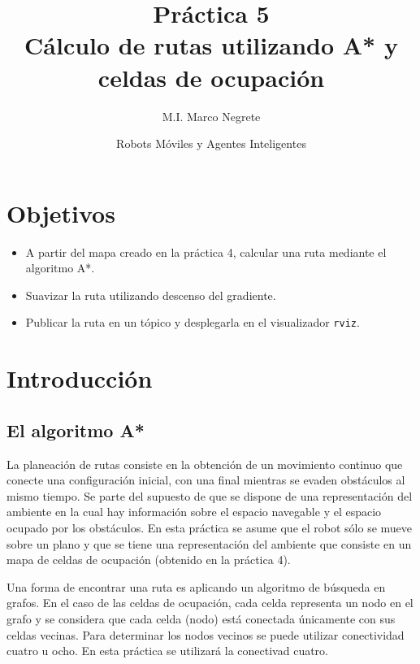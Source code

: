 \documentclass[letterpaper,12pt]{article}
\title{Práctica 5  \\ Cálculo de rutas utilizando A* y celdas de ocupación}
\author{M.I. Marco Negrete}
\date{Robots Móviles y Agentes Inteligentes}
\begin{document}
\renewcommand{\tablename}{Tabla}
\maketitle
\section*{Objetivos}
\begin{itemize}
\item A partir del mapa creado en la práctica 4, calcular una ruta mediante el algoritmo A*.
\item Suavizar la ruta utilizando descenso del gradiente. 
\item Publicar la ruta en un tópico y desplegarla en el visualizador \texttt{rviz}.
\end{itemize}

\section{Introducción}
\subsection{El algoritmo A*}
La planeación de rutas consiste en la obtención de un movimiento continuo que conecte una configuración inicial, con una final mientras se evaden obstáculos al mismo tiempo. Se parte del supuesto de que se dispone de una representación del ambiente en la cual hay información sobre el espacio navegable y el espacio ocupado por los obstáculos. En esta práctica se asume que el robot sólo se mueve sobre un plano y que se tiene una representación del ambiente que consiste en un mapa de celdas de ocupación (obtenido en la práctica 4). 

Una forma de encontrar una ruta es aplicando un algoritmo de búsqueda en grafos. En el caso de las celdas de ocupación, cada celda representa un nodo en el grafo y se considera que cada celda (nodo) está conectada únicamente con sus celdas vecinas. Para determinar los nodos vecinos se puede utilizar conectividad cuatro u ocho. En esta práctica se utilizará la conectivad cuatro. 
\end{document}
